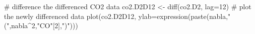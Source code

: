 \begin{Schunk}
\begin{Sinput}
 # difference the differenced CO2 data
 co2.D2D12 <- diff(co2.D2, lag=12)
 # plot the newly differenced data
 plot(co2.D2D12,
      ylab=expression(paste(nabla,"(",nabla^2,"CO"[2],")")))
\end{Sinput}
\end{Schunk}
